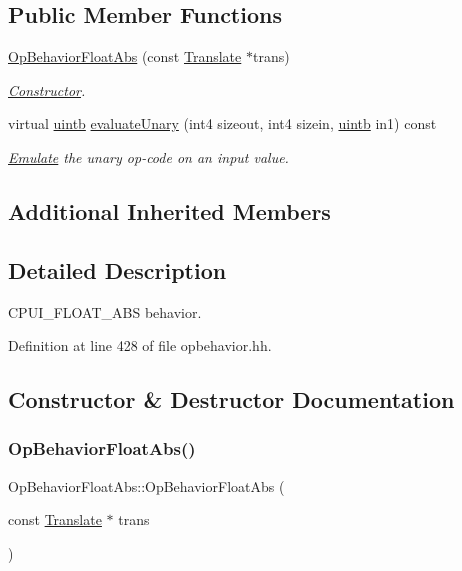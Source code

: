 \subsection*{Public Member Functions}
\begin{DoxyCompactItemize}
\item 
\mbox{\hyperlink{class_op_behavior_float_abs_a861d9d88d4190f4eb29d5750b3206a54}{Op\+Behavior\+Float\+Abs}} (const \mbox{\hyperlink{class_translate}{Translate}} $\ast$trans)
\begin{DoxyCompactList}\small\item\em \mbox{\hyperlink{class_constructor}{Constructor}}. \end{DoxyCompactList}\item 
virtual \mbox{\hyperlink{types_8h_a2db313c5d32a12b01d26ac9b3bca178f}{uintb}} \mbox{\hyperlink{class_op_behavior_float_abs_a2471c7df22ae3b091277c8b138cdc4a1}{evaluate\+Unary}} (int4 sizeout, int4 sizein, \mbox{\hyperlink{types_8h_a2db313c5d32a12b01d26ac9b3bca178f}{uintb}} in1) const
\begin{DoxyCompactList}\small\item\em \mbox{\hyperlink{class_emulate}{Emulate}} the unary op-\/code on an input value. \end{DoxyCompactList}\end{DoxyCompactItemize}
\subsection*{Additional Inherited Members}


\subsection{Detailed Description}
C\+P\+U\+I\+\_\+\+F\+L\+O\+A\+T\+\_\+\+A\+BS behavior. 

Definition at line 428 of file opbehavior.\+hh.



\subsection{Constructor \& Destructor Documentation}
\mbox{\label{class_op_behavior_float_abs_a861d9d88d4190f4eb29d5750b3206a54}} 
\subsubsection{\texorpdfstring{OpBehaviorFloatAbs()}{OpBehaviorFloatAbs()}}
{\footnotesize\ttfamily Op\+Behavior\+Float\+Abs\+::\+Op\+Behavior\+Float\+Abs (\begin{DoxyParamCaption}\item[{const \mbox{\hyperlink{class_translate}{Translate}} $\ast$}]{trans }\end{DoxyParamCaption})\hspace{0.3cm}{\ttfamily [inline]}}



